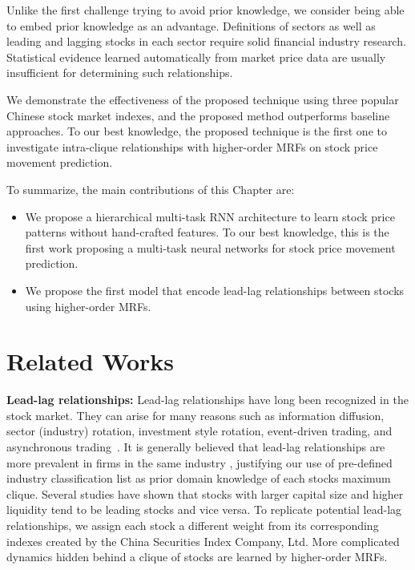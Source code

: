 Unlike the first challenge trying to avoid prior knowledge, we
consider being able to embed prior knowledge as an advantage.
Definitions of sectors as well as leading and lagging stocks in
each sector require solid financial industry research.
Statistical evidence learned automatically from market price data
are usually insufficient for determining such relationships.

We demonstrate the effectiveness of the proposed technique using
three popular Chinese stock market indexes, and the proposed
method outperforms baseline approaches. To our best knowledge,
the proposed technique is the first one to investigate
intra-clique relationships with higher-order MRFs on stock price
movement prediction.
  
To summarize, the main contributions of this Chapter are:
\begin{itemize}
\item We propose a hierarchical multi-task RNN architecture to
  learn stock price patterns without hand-crafted features. To
  our best knowledge, this is the first work proposing a
  multi-task neural networks for stock price movement prediction.
\item We propose the first model that encode lead-lag
  relationships between stocks using higher-order MRFs.
\end{itemize}

\section{Related Works}
\label{sec:background}

\textbf{Lead-lag relationships:} Lead-lag relationships have long
been recognized in the stock market. They can arise for many
reasons such as information diffusion, sector (industry)
rotation, investment style rotation, event-driven trading, and
asynchronous
trading~\cite{lo1990contrarian,chordia2000trading,conrad1988time,hameed1997time}.
It is generally believed that lead-lag relationships are more
prevalent in firms in the same industry \cite{hou2007industry},
justifying our use of pre-defined industry classification list
\cite{ths} as prior domain knowledge of each
stock\textquotesingle s maximum clique. Several studies
\cite{brennan1993investment,hou2007industry,badrinath1995shepherds,mcqueen1996delayed}
have shown that stocks with larger capital size and higher
liquidity tend to be leading stocks and vice versa. To replicate
potential lead-lag relationships, we assign each stock a
different weight from its corresponding indexes created by the
China Securities Index Company, Ltd. More complicated dynamics
hidden behind a clique of stocks are learned by higher-order
MRFs.

